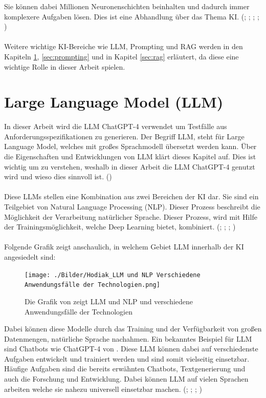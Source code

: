 \documentclass[12pt,toc=bib,toc=listof]{scrreprt}
\begin{document}
\noindent Sie können dabei Millionen Neuronenschichten beinhalten und dadurch immer komplexere Aufgaben lösen. Dies ist eine Abhandlung über das Thema KI. (\cite{Bhatt2021}; \cite{Hecker2018}; \cite{Mocko2021}; \cite{Roscher2025}; \cite{Zhu2021})\\
\\
Weitere wichtige KI-Bereiche wie LLM, Prompting und RAG werden in den Kapiteln \ref{sec:llm}, \ref{sec:prompting} und in Kapitel \ref{sec:rag} erläutert, da diese eine wichtige Rolle in dieser Arbeit spielen.

\section{Large Language Model (LLM)} %
\label{sec:llm}
In dieser Arbeit wird die LLM ChatGPT-4 verwendet um Testfälle aus Anforderungsspezifikationen zu generieren. Der Begriff LLM, steht für Large Language Model, welches mit großes Sprachmodell übersetzt werden kann. Über die Eigenschaften und Entwicklungen von LLM klärt dieses Kapitel auf. Dies ist wichtig um zu verstehen, weshalb in dieser Arbeit die LLM ChatGPT-4 genutzt wird und wieso dies sinnvoll ist. (\cite{OpenAI2025})\\
\\
Diese LLMs stellen eine Kombination aus zwei Bereichen der KI dar. Sie sind ein Teilgebiet von Natural Language Processing (NLP). Dieser Prozess beschreibt die Möglichkeit der Verarbeitung natürlicher Sprache. Dieser Prozess, wird mit Hilfe der Trainingsmöglichkeit, welche Deep Learning bietet, kombiniert. (\cite{Chang2023}; \cite{Kaddour2023}; \cite{Naveed2024}; \cite{Schneider2024})\\
\\
Folgende Grafik zeigt anschaulich, in welchem Gebiet LLM innerhalb der KI angesiedelt sind:

\begin{figure} [H]
    \centering
    \texttt{[image: ./Bilder/Hodiak\_LLM und NLP Verschiedene Anwendungsfälle der Technologien.png]}
    \caption{Die Grafik von \textcite{Hodiak2024} zeigt LLM und NLP und  verschiedene Anwendungsfälle der Technologien}
    \label{fig:enter-label}
\end{figure}
\noindent Dabei können diese Modelle durch das Training und der Verfügbarkeit von großen Datenmengen, natürliche Sprache nachahmen. Ein bekanntes Beispiel für LLM sind Chatbots wie ChatGPT-4 von \textcite{OpenAI2025}. Diese LLM können dabei auf verschiedenste Aufgaben entwickelt und trainiert werden und sind somit vielseitig einsetzbar. Häufige Aufgaben sind die bereits erwähnten Chatbots, Textgenerierung und auch die Forschung und Entwicklung. Dabei können LLM auf vielen Sprachen arbeiten welche sie nahezu universell einsetzbar machen. (\cite{Chang2023}; \cite{Kaddour2023}; \cite{Naveed2024}; \cite{Schneider2024})
\end{document}
